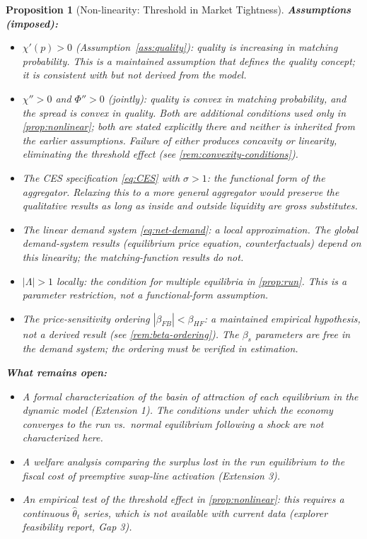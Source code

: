 \documentclass[12pt]{article}
\newtheorem{proposition}{Proposition}
\theoremstyle{definition}
\newcommand{\1}[1]{\mathds{1}\left[#1\right]}
\begin{document}
\begin{proposition}[Non-linearity: Threshold in Market Tightness]
\noindent\textbf{Assumptions (imposed):}
\begin{itemize}[noitemsep]
  \item $\chi'(p) > 0$ (Assumption~\ref{ass:quality}): quality is increasing in
        matching probability. This is a maintained assumption that defines the
        quality concept; it is consistent with but not derived from the model.
  \item $\chi'' > 0$ and $\Phi'' > 0$ (jointly): quality is convex in matching
        probability, and the spread is convex in quality. Both are additional
        conditions used only in \cref{prop:nonlinear}; both are stated
        explicitly there and neither is inherited from the earlier assumptions.
        Failure of either produces concavity or linearity, eliminating the
        threshold effect (see \cref{rem:convexity-conditions}).
  \item The CES specification \eqref{eq:CES} with $\sigma > 1$: the functional
        form of the aggregator. Relaxing this to a more general aggregator
        would preserve the qualitative results as long as inside and outside
        liquidity are gross substitutes.
  \item The linear demand system \eqref{eq:net-demand}: a local approximation.
        The global demand-system results (equilibrium price equation,
        counterfactuals) depend on this linearity; the matching-function results
        do not.
  \item $|\Lambda| > 1$ locally: the condition for multiple equilibria in
        \cref{prop:run}. This is a parameter restriction, not a functional-form
        assumption.
  \item The price-sensitivity ordering $|\beta_{FB}| < \beta_{HF}$: a
        \emph{maintained empirical hypothesis}, not a derived result (see
        \cref{rem:beta-ordering}). The $\beta_s$ parameters are free in the
        demand system; the ordering must be verified in estimation.
\end{itemize}

\noindent\textbf{What remains open:}
\begin{itemize}[noitemsep]
  \item A formal characterization of the basin of attraction of each equilibrium
        in the dynamic model (Extension 1). The conditions under which the
        economy converges to the run vs.\ normal equilibrium following a shock
        are not characterized here.
  \item A welfare analysis comparing the surplus lost in the run equilibrium
        to the fiscal cost of preemptive swap-line activation (Extension 3).
  \item An empirical test of the threshold effect in \cref{prop:nonlinear}: this
        requires a continuous $\hat\theta_t$ series, which is not available
        with current data (\emph{explorer feasibility report, Gap 3}).
\end{itemize}


\end{proposition}
\end{document}
